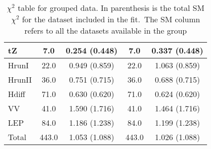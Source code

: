 \documentclass{article}
\begin{document}
\begin{table}[H]
\begin{tabular}{|l|c|c|c|c|}
tZ & 7.0                         & 0.254                             (0.448) & 7.0                         & 0.337                             (0.448) \\ \hline
HrunI & 22.0                         & 0.949                             (0.859) & 22.0                         & 1.063                             (0.859) \\ \hline
HrunII & 36.0                         & 0.751                             (0.715) & 36.0                         & 0.688                             (0.715) \\ \hline
Hdiff & 71.0                         & 0.630                             (0.620) & 71.0                         & 0.624                             (0.620) \\ \hline
VV & 41.0                         & 1.590                             (1.716) & 41.0                         & 1.464                             (1.716) \\ \hline
LEP & 84.0                         & 1.186                             (1.238) & 84.0                         & 1.199                             (1.238) \\ \hline
 \hline Total & 443.0                 & 1.053                     (1.088) & 443.0                 & 1.026                     (1.088) \\ \hline
\end{tabular}
\caption{$\chi^2$ table for grouped data. In parenthesis is the total SM $\chi^2$ for the dataset included in the fit.\
                    The SM column refers to all the datasets available in the group}
\end{table}
\end{document}
